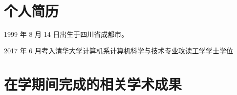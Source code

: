 
\begin{resume}

  \section*{个人简历}

  1999 年 8 月 14 日出生于四川省成都市。

  2017 年 6 月考入清华大学计算机系计算机科学与技术专业攻读工学学士学位

  \section*{在学期间完成的相关学术成果}

\end{resume}
